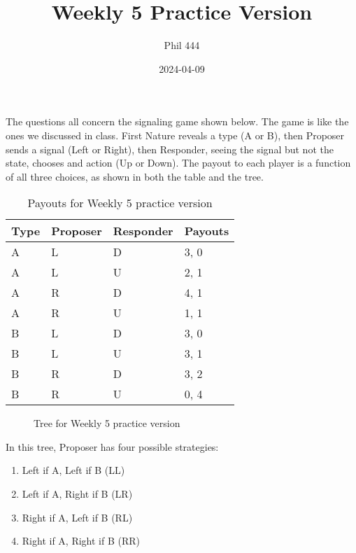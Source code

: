\documentclass[
  12pt,
  letterpaper,
  DIV=11,
  numbers=noendperiod]{scrartcl}
\title{Weekly 5 Practice Version}
\author{Phil 444}
\date{2024-04-09}
\providecommand{\tightlist}{%
  \setlength{\itemsep}{0pt}\setlength{\parskip}{0pt}}\usepackage{longtable,booktabs,array}
\begin{document}
\maketitle

The questions all concern the signaling game shown below. The game is
like the ones we discussed in class. First Nature reveals a type (A or
B), then Proposer sends a signal (Left or Right), then Responder, seeing
the signal but not the state, chooses and action (Up or Down). The
payout to each player is a function of all three choices, as shown in
both the table and the tree.

\begin{longtable}[]{@{}llll@{}}

\caption{\label{tbl-tree-payouts}Payouts for Weekly 5 practice version}

\tabularnewline

\toprule\noalign{}
Type & Proposer & Responder & Payouts \\
\midrule\noalign{}
\endhead
\bottomrule\noalign{}
\endlastfoot
A & L & D & 3, 0 \\
A & L & U & 2, 1 \\
A & R & D & 4, 1 \\
A & R & U & 1, 1 \\
B & L & D & 3, 0 \\
B & L & U & 3, 1 \\
B & R & D & 3, 2 \\
B & R & U & 0, 4 \\

\end{longtable}

\begin{figure}


\caption{\label{fig-tree}Tree for Weekly 5 practice version}

\end{figure}%

\newpage

In this tree, Proposer has four possible strategies:

\begin{enumerate}
\def\labelenumi{\arabic{enumi}.}
\tightlist
\item
  Left if A, Left if B (LL)
\item
  Left if A, Right if B (LR)
\item
  Right if A, Left if B (RL)
\item
  Right if A, Right if B (RR)
\end{enumerate}
\end{document}
